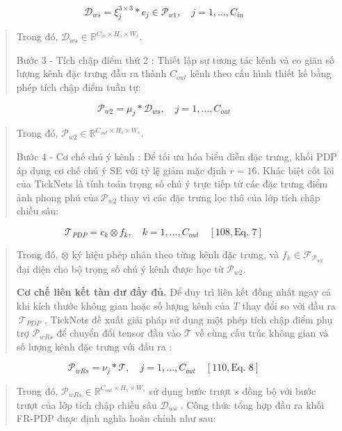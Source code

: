 \documentclass[
]{article}
\begin{document}
\[\mathcal{D}_{ws} = \xi_{j}^{3 \times 3}*c_{j} \in \mathcal{P}_{w1},\quad j = 1,\ldots,C_{in}\]

\begin{quote}
Trong đó,
\(\mathcal{D}_{ws} \in \mathbb{R}^{C_{in} \times H_{s} \times W_{s}}\).

Bước 3 - Tích chập điểm thứ 2 : Thiết lập sự tương tác kênh và co giãn
số lượng kênh đặc trưng đầu ra thành \(C_{out}\) kênh theo cấu hình
thiết kế bằng phép tích chập điểm tuần tự:
\end{quote}

\[\mathcal{P}_{w2} = \mu_{j}*\mathcal{D}_{ws},\quad j = 1,\ldots,C_{out}\]

\begin{quote}
Trong đó,
\(\mathcal{P}_{w2} \in \mathbb{R}^{C_{out} \times H_{s} \times W_{s}}\).

Bước 4 - Cơ chế chú ý kênh : Để tối ưu hóa biểu diễn đặc trưng, khối PDP
áp dụng cơ chế chú ý SE với tỷ lệ giảm mặc định \(r = 16\). Khác biệt
cốt lõi của TickNets là tính toán trọng số chú ý trực tiếp từ các đặc
trưng điểm ảnh phong phú của\(\mathcal{\ P}_{w2}\) thay vì các đặc trưng
lọc thô của lớp tích chập chiều sâu:
\end{quote}

\[\mathcal{T}_{PDP} = c_{k} \otimes f_{k},\quad k = 1,\ldots,C_{out}\quad\left\lbrack 108,\text{Eq.~7} \right\rbrack\]

\begin{quote}
Trong đó, \(\otimes\) ký hiệu phép nhân theo từng kênh đặc trưng, và
\(f_{k} \in \mathcal{F}_{\mathcal{P}_{w2}}\) đại diện cho bộ trọng số
chú ý kênh được học từ \(\mathcal{P}_{w2}\).

\textbf{Cơ chế liên kết tàn dư đầy đủ.} Để duy trì liên kết đồng nhất
ngay cả khi kích thước không gian hoặc số lượng kênh của \(T\) thay đổi
so với đầu ra \(\ \mathcal{T}_{PDP}\) , TickNets đề xuất giải pháp sử
dụng một phép tích chập điểm phụ trợ \(\mathcal{P}_{wRs}\) để chuyển đổi
tensor đầu vào \(\mathcal{T}\) về cùng cấu trúc không gian và số lượng
kênh đặc trưng với đầu ra :
\end{quote}

\[\mathcal{P}_{wRs} = \nu_{j}*\mathcal{T},\quad j = 1,\ldots,C_{out}\quad\left\lbrack 110,\text{Eq.~8} \right\rbrack\]

\begin{quote}
Trong đó,
\(\mathcal{P}_{wRs} \in \mathbb{R}^{C_{out} \times H_{s} \times W_{s}}\)
sử dụng bước trượt \(s\) đồng bộ với bước trượt của lớp tích chập chiều
sâu \(\mathcal{D}_{ws}\) . Công thức tổng hợp đầu ra khối FR-PDP được
định nghĩa hoàn chỉnh như sau:
\end{quote}
\end{document}
